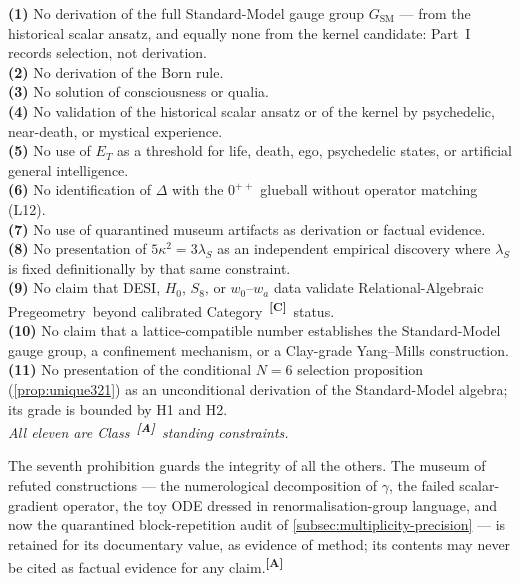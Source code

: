 \documentclass[12pt,a4paper,twoside]{article}
\theoremstyle{plain}
\theoremstyle{definition}
\theoremstyle{remark}
\newcommand{\ProjectShort}{Relational-Algebraic Pregeometry}
\newcommand{\RAP}{\ProjectShort}
\newcommand{\catmark}[1]{\textsuperscript{\textsf{\textbf{[#1]}}}}
\begin{document}
\begin{governancebox}
\textbf{(1)} No derivation of the full Standard-Model gauge group
$G_{\mathrm{SM}}$ --- from the historical scalar ansatz, and equally none from the
kernel candidate: Part~I records selection, not derivation.\\[0.3em]
\textbf{(2)} No derivation of the Born rule.\\[0.3em]
\textbf{(3)} No solution of consciousness or qualia.\\[0.3em]
\textbf{(4)} No validation of the historical scalar ansatz or of the kernel by psychedelic,
near-death, or mystical experience.\\[0.3em]
\textbf{(5)} No use of $E_T$ as a threshold for life, death, ego,
psychedelic states, or artificial general intelligence.\\[0.3em]
\textbf{(6)} No identification of $\Delta$ with the $0^{++}$ glueball
without operator matching (L12).\\[0.3em]
\textbf{(7)} No use of quarantined museum artifacts as derivation or
factual evidence.\\[0.3em]
\textbf{(8)} No presentation of $5\kappa^2 = 3\lambda_S$ as an
independent empirical discovery where $\lambda_S$ is fixed
definitionally by that same constraint.\\[0.3em]
\textbf{(9)} No claim that DESI, $H_0$, $S_8$, or $w_0$--$w_a$ data
validate \RAP\ beyond calibrated Category~\catmark{C}\
status.\\[0.3em]
\textbf{(10)} No claim that a lattice-compatible number establishes the
Standard-Model gauge group, a confinement mechanism, or a Clay-grade
Yang--Mills construction.\\[0.3em]
\textbf{(11)} No presentation of the conditional $N=6$ selection
proposition (\cref{prop:unique321}) as an unconditional derivation of
the Standard-Model algebra; its grade is bounded by H1 and H2.\\[0.3em]
\emph{All eleven are Class~\catmark{A}\ standing constraints.}
\end{governancebox}

\noindent The seventh prohibition guards the integrity of all the
others. The museum of refuted constructions --- the numerological
decomposition of $\gamma$, the failed scalar-gradient operator, the toy
ODE dressed in renormalisation-group language, and now the quarantined
block-repetition audit of \cref{subsec:multiplicity-precision} --- is
retained for its documentary value, as evidence of method; its contents
may never be cited as factual evidence for any claim.\catmark{A}
\end{document}
